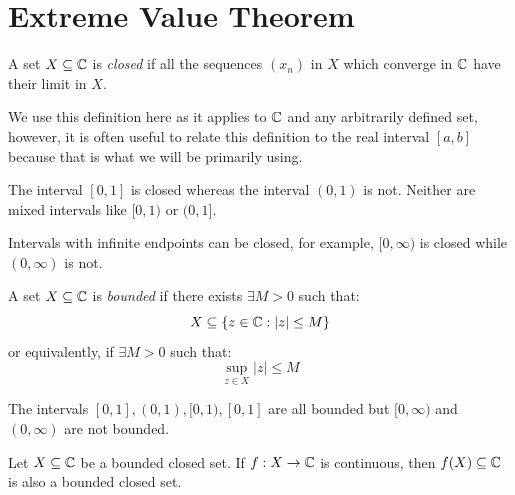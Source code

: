 \documentclass[../main.tex]{subfiles}
\begin{document}
\section{Extreme Value Theorem}
\begin{definition}
  A set $X \subseteq \mathbb{C}$ is \textit{closed} if all the sequences $(x_n)$ in $X$ which converge in $\mathbb{C}$ have their limit in $X$.
\end{definition}
\begin{remark}
  We use this definition here as it applies to $\mathbb{C}$ and any arbitrarily defined set, however, it is often useful to relate this definition to the real interval $[a, b]$ because that is what we will be primarily using.
\end{remark}
\begin{example}
  The interval $[0, 1]$ is closed whereas the interval $(0, 1)$ is not.
  Neither are mixed intervals like $[0, 1)$ or $(0, 1]$.

  Intervals with infinite endpoints can be closed, for example, $[0, \infty)$ is closed while $(0, \infty)$ is not.
\end{example}
\begin{definition}
  A set $X \subseteq \mathbb{C}$ is \textit{bounded} if there exists $\exists M > 0$ such that:
  \[
    X \subseteq \{z \in \mathbb{C}: |z| \leq M\}
  \]
  or equivalently, if $\exists M > 0$ such that:
  \[
    \sup_{z \in X} |z| \leq M
  \]
\end{definition}
\begin{example}
  The intervals $[0, 1], (0, 1), [0, 1), [0, 1]$ are all bounded but $[0, \infty)$ and $(0, \infty)$ are not bounded.
\end{example}
\begin{proposition}
  Let $X \subseteq \mathbb{C}$ be a bounded closed set.
  If $f: X \to \mathbb{C}$ is continuous, then $f(X) \subseteq \mathbb{C}$ is also a bounded closed set.
  \label{boundedClosedPreserved}
\end{proposition}
\end{document}
